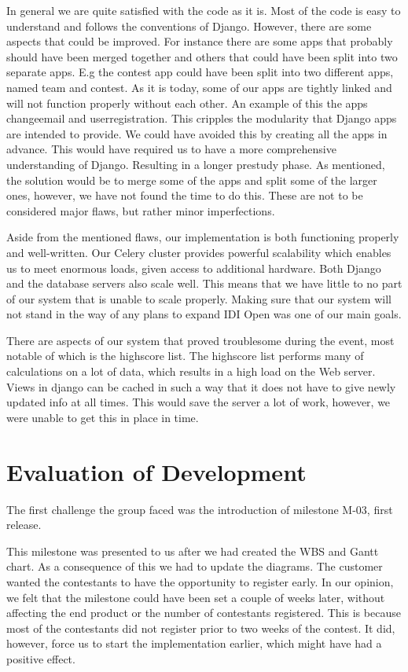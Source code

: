 In general we are quite satisfied with the code as it is. Most of the
code is easy to understand and follows the conventions of Django.
However, there are some aspects that could be improved. For instance
there are some apps that probably should have been merged together and
others that could have been split into two separate apps. E.g the
contest app could have been split into two different apps, named team
and contest. As it is today, some of our apps are tightly linked and
will not function properly without each other. An example of this the
apps changeemail and userregistration. This cripples the modularity
that Django apps are intended to provide. We could have avoided this by
creating all the apps in advance. This would have required us to have a
more comprehensive understanding of Django. Resulting in a longer
prestudy phase. As mentioned, the solution would be to merge some of
the apps and split some of the larger ones, however, we have not found
the time to do this. These are not to be considered major flaws, but
rather minor imperfections. 

Aside from the mentioned flaws, our implementation is both functioning
properly and well-written. Our Celery cluster provides powerful
scalability which enables us to meet enormous loads, given access to
additional hardware. Both Django and the database servers also scale
well. This means that we have little to no part of our system that is
unable to scale properly. Making sure that our system will not stand in
the way of any plans to expand IDI Open was one of our main goals.

There are aspects of our system that proved troublesome during the
event, most notable of which is the highscore list. The highscore list
performs many of calculations on a lot of data, which results in a high
load on the Web server. Views in django can be cached in such a way
that it does not have to give newly updated info at all times. This
would save the server a lot of work, however, we were unable to get
this in place in time. 

\section{Evaluation of Development}

The first challenge the group faced was the introduction of milestone
M-03, first release. 

This milestone was presented to us after we had created the WBS and
Gantt chart. As a consequence of this we had to update the diagrams.
The customer wanted the contestants to have the opportunity to register
early. In our opinion, we felt that the milestone could have been set a
couple of weeks later, without affecting the end product or the number
of contestants registered. This is because most of the contestants did
not register prior to two weeks of the contest. It did, however, force
us to start the implementation earlier, which might have had a positive
effect.

